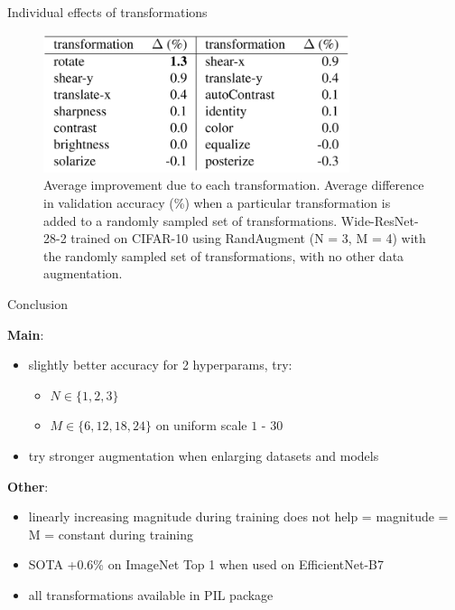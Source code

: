 \documentclass{beamer}
\begin{document}
\begin{frame}{Individual effects of transformations}
\begin{figure}[h]
\includegraphics[width=0.8\textwidth]{img/trans}
\caption{Average improvement due to each transformation. Average difference in validation accuracy (\%) when a particular transformation is added to a randomly sampled set of transformations. Wide-ResNet-28-2 trained on CIFAR-10 using RandAugment (N = 3, M = 4) with the randomly sampled set of transformations, with no other data augmentation.}
\end{figure}
\end{frame}
\begin{frame}{Conclusion}

\textbf{Main}:
\begin{itemize}
\item slightly better accuracy for 2 hyperparams, try: 
\begin{itemize}
\item $N \in \{1, 2, 3\}$
\item $M \in \{6, 12, 18, 24\}$ on uniform scale $1$ - $30$

\end{itemize}

\item try stronger augmentation when enlarging datasets and models
\end{itemize}

\vfill

\textbf{Other}:
\begin{itemize}
\item linearly increasing magnitude during training does not help = magnitude = M = constant during training
\item SOTA +0.6\% on ImageNet Top 1 when used on EfficientNet-B7 \cite{cit:sota} 
\item all transformations available in PIL package \cite{cit:pil}
\end{itemize}

\end{frame}
\end{document}
